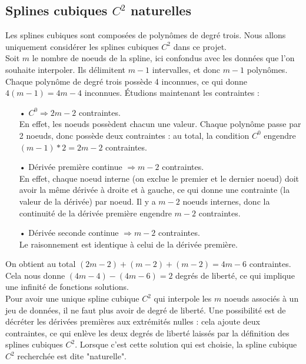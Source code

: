 \documentclass[a4paper,12pt]{article} %
\begin{document}
		\subsection{Splines cubiques $C^2$ naturelles}

            Les splines cubiques sont composées de polynômes de degré trois. Nous allons uniquement considérer les splines cubiques $C^2$ dans ce projet. \\
            
            Soit $m$ le nombre de noeuds de la spline, ici confondus avec les données que l'on souhaite interpoler. Ils délimitent $m-1$ intervalles, et donc $m-1$ polynômes. Chaque polynôme de degré trois possède 4 inconnues, ce qui donne $4(m-1) = 4m - 4$ inconnues. Étudions maintenant les contraintes : 
            \begin{itemize}
                \item[•] $C^0 \Rightarrow 2m-2$ contraintes.\\ 
                En effet, les noeuds possèdent chacun une valeur. Chaque polynôme passe par 2 noeuds, donc possède deux contraintes : au total, la condition $C^0$ engendre $(m-1)*2 = 2m-2$ contraintes. 
                \item[•] Dérivée première continue $\Rightarrow m-2$ contraintes. \\
                En effet, chaque noeud interne (on exclue le premier et le dernier noeud) doit avoir la même dérivée à droite et à gauche, ce qui donne une contrainte (la valeur de la dérivée) par noeud. Il y a $m-2$ noeuds internes, donc la continuité de la dérivée première engendre $m-2$ contraintes.
                \item[•] Dérivée seconde continue $\Rightarrow m-2$ contraintes. \\
                Le raisonnement est identique à celui de la dérivée première.
            \end{itemize}
            On obtient au total $(2m-2) + (m-2) + (m-2) = 4m-6$ contraintes. Cela nous donne $(4m-4) - (4m-6) = 2$ degrés de liberté, ce qui implique une infinité de fonctions solutions.\\
            
            Pour avoir une unique spline cubique $C^2$ qui interpole les $m$ noeuds associés à un jeu de données, il ne faut plus avoir de degré de liberté. Une possibilité est de décréter les dérivées premières aux extrémités nulles : cela ajoute deux contraintes, ce qui enlève les deux degrés de liberté laissés par la définition des splines cubiques $C^2$. Lorsque c'est cette solution qui est choisie, la spline cubique $C^2$ recherchée est dite "naturelle".\\
            
\end{document}
